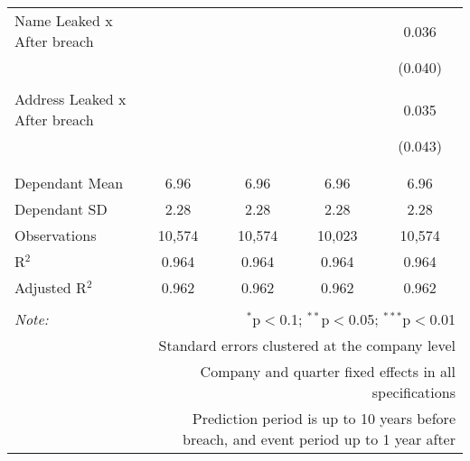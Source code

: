 \begin{table}[!htbp]
\begin{tabular}{@{\extracolsep{5pt}}lcccc}
 Name Leaked x After breach &  &  &  & 0.036 \\ 
  &  &  &  & (0.040) \\ 
  & & & & \\ 
 Address Leaked x After breach &  &  &  & 0.035 \\ 
  &  &  &  & (0.043) \\ 
  & & & & \\ 
\hline \\[-1.8ex] 
Dependant Mean & 6.96 & 6.96 & 6.96 & 6.96 \\ 
Dependant SD & 2.28 & 2.28 & 2.28 & 2.28 \\ 
Observations & 10,574 & 10,574 & 10,023 & 10,574 \\ 
R$^{2}$ & 0.964 & 0.964 & 0.964 & 0.964 \\ 
Adjusted R$^{2}$ & 0.962 & 0.962 & 0.962 & 0.962 \\ 
\hline 
\hline \\[-1.8ex] 
\textit{Note:}  & \multicolumn{4}{r}{$^{*}$p$<$0.1; $^{**}$p$<$0.05; $^{***}$p$<$0.01} \\ 
 & \multicolumn{4}{r}{Standard errors clustered at the company level} \\ 
 & \multicolumn{4}{r}{Company and quarter fixed effects in all specifications} \\ 
 & \multicolumn{4}{r}{Prediction period is up to 10 years before breach, and event period up to 1 year after} \\ 
\end{tabular} 
\end{table} 
